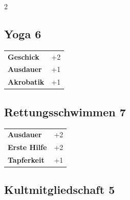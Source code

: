 \begin{multicols}{2}
\begin{tcolorbox}
\end{tcolorbox}

\begin{tcolorbox}
    \subsection*{Yoga \hfill \small{6 }}
    \tcblower




\begin{tabular}{@{}ll@{}}
    \textbf{Geschick} & +2\\
    \textbf{Ausdauer} & +1\\
    \textbf{Akrobatik} & +1\\
\end{tabular}


\end{tcolorbox}

\begin{tcolorbox}
    \subsection*{Rettungsschwimmen \hfill \small{7 }}
    \tcblower




\begin{tabular}{@{}ll@{}}
    \textbf{Ausdauer} & +2\\
    \textbf{Erste Hilfe} & +2\\
    \textbf{Tapferkeit} & +1\\
\end{tabular}


\end{tcolorbox}

\begin{tcolorbox}
    \subsection*{Kultmitgliedschaft \hfill \small{5 }}
    \tcblower





\end{tcolorbox}
\end{multicols}
